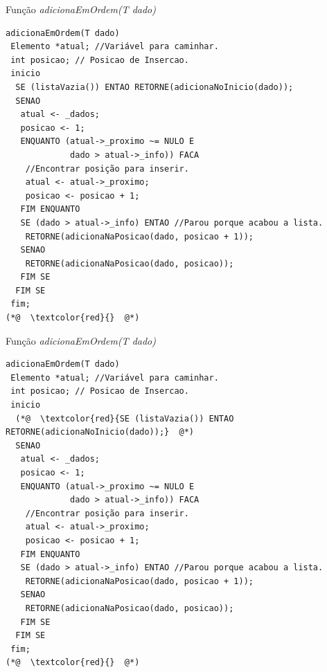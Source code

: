 \documentclass[12pt,table,xcolor={dvipsnames}]{beamer}
\begin{document}
\begin{frame}[fragile]{Função \textit{adicionaEmOrdem(T dado)}}
\begin{lstlisting}
adicionaEmOrdem(T dado)
 Elemento *atual; //Variável para caminhar.
 int posicao; // Posicao de Insercao.
 inicio
  SE (listaVazia()) ENTAO RETORNE(adicionaNoInicio(dado));
  SENAO
   atual <- _dados;
   posicao <- 1;
   ENQUANTO (atual->_proximo ~= NULO E
             dado > atual->_info)) FACA 
    //Encontrar posição para inserir.
    atual <- atual->_proximo;
    posicao <- posicao + 1;
   FIM ENQUANTO
   SE (dado > atual->_info) ENTAO //Parou porque acabou a lista.
    RETORNE(adicionaNaPosicao(dado, posicao + 1));
   SENAO
    RETORNE(adicionaNaPosicao(dado, posicao));
   FIM SE
  FIM SE
 fim;
(*@  \textcolor{red}{}  @*)
\end{lstlisting}
\end{frame}

\begin{frame}[fragile]{Função \textit{adicionaEmOrdem(T dado)}}
\begin{lstlisting}
adicionaEmOrdem(T dado)
 Elemento *atual; //Variável para caminhar.
 int posicao; // Posicao de Insercao.
 inicio
  (*@  \textcolor{red}{SE (listaVazia()) ENTAO RETORNE(adicionaNoInicio(dado));}  @*)
  SENAO
   atual <- _dados;
   posicao <- 1;
   ENQUANTO (atual->_proximo ~= NULO E
             dado > atual->_info)) FACA 
    //Encontrar posição para inserir.
    atual <- atual->_proximo;
    posicao <- posicao + 1;
   FIM ENQUANTO
   SE (dado > atual->_info) ENTAO //Parou porque acabou a lista.
    RETORNE(adicionaNaPosicao(dado, posicao + 1));
   SENAO
    RETORNE(adicionaNaPosicao(dado, posicao));
   FIM SE
  FIM SE
 fim;
(*@  \textcolor{red}{}  @*)
\end{lstlisting}
\end{frame}
\end{document}

